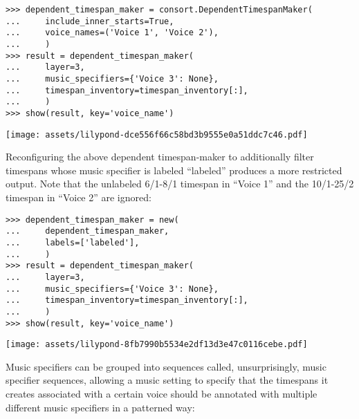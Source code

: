 \begin{abjadbookoutput}
\begin{singlespacing}
\vspace{-0.5\baselineskip}
\begin{verbatim}
>>> dependent_timespan_maker = consort.DependentTimespanMaker(
...     include_inner_starts=True,
...     voice_names=('Voice 1', 'Voice 2'),
...     )
>>> result = dependent_timespan_maker(
...     layer=3,
...     music_specifiers={'Voice 3': None},
...     timespan_inventory=timespan_inventory[:],
...     )
>>> show(result, key='voice_name')
\end{verbatim}
\noindent\texttt{[image: assets/lilypond-dce556f66c58bd3b9555e0a51ddc7c46.pdf]}
\end{singlespacing}
\end{abjadbookoutput}

\noindent Reconfiguring the above dependent timespan-maker to additionally
filter timespans whose music specifier is labeled \enquote{labeled} produces a
more restricted output. Note that the unlabeled 6/1-8/1 timespan in
\enquote{Voice 1} and the 10/1-25/2 timespan in \enquote{Voice 2} are ignored:

\begin{comment}
<abjad>
dependent_timespan_maker = new(
    dependent_timespan_maker,
    labels=['labeled'],
    )
result = dependent_timespan_maker(
    layer=3,
    music_specifiers={'Voice 3': None},
    timespan_inventory=timespan_inventory[:],
    )
show(result, key='voice_name')
</abjad>
\end{comment}

\begin{abjadbookoutput}
\begin{singlespacing}
\vspace{-0.5\baselineskip}
\begin{verbatim}
>>> dependent_timespan_maker = new(
...     dependent_timespan_maker,
...     labels=['labeled'],
...     )
>>> result = dependent_timespan_maker(
...     layer=3,
...     music_specifiers={'Voice 3': None},
...     timespan_inventory=timespan_inventory[:],
...     )
>>> show(result, key='voice_name')
\end{verbatim}
\noindent\texttt{[image: assets/lilypond-8fb7990b5534e2df13d3e47c0116cebe.pdf]}
\end{singlespacing}
\end{abjadbookoutput}

\noindent Music specifiers can be grouped into sequences called,
unsurprisingly, music specifier sequences, allowing a music setting to specify
that the timespans it creates associated with a certain voice should be
annotated with multiple different music specifiers in a patterned way:

